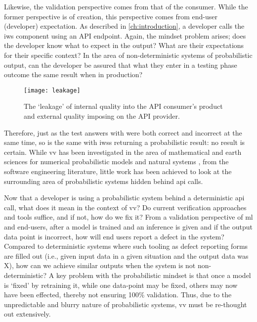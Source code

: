 Likewise, the validation perspective comes from that of the consumer. While the former perspective is of creation, this perspective comes from end-user (developer) expectation. As described in \cref{ch:introduction}, a developer calls the \gls{iws} component using an API endpoint. Again, the mindset problem arises; does the developer know what to expect in the output? What are their expectations for their specific context? In the area of non-deterministic systems of probabilistic output, can the developer be assured that what they enter in a testing phase outcome the same result when in production?

\begin{figure}[hbt]
  \centering
  \texttt{[image: leakage]}
  \caption[Leakage of internal and external quality in ]{The `leakage' of internal quality into the API consumer's product and external quality imposing on the API provider.}
  \label{fig:background:software-quality:v-and-v:leakage}
\end{figure}

Therefore, just as the test answers with were both correct and incorrect at the same time, so is the same with \glspl{iws} returning a probabilistic result: no result is certain. While \gls{vv} has been investigated in the area of mathematical and earth sciences for numerical probabilistic models and natural systems \citep{Oreskes:1994gn,Rutten:2004a}, from the software engineering literature, little work has been achieved to look at the surrounding area of probabilistic systems hidden behind \gls{api} calls. 

Now that a developer is using  a probabilistic system behind a deterministic \gls{api} call, what does it mean in the context of \gls{vv}? Do current verification approaches and tools suffice, and if not, how do we fix it? From a validation perspective of \gls{ml} and end-users, after a model is trained and an inference is given and if the output data point is incorrect, how will end users report a defect in the system? Compared to deterministic systems where such tooling as defect reporting forms are filled out (i.e., given input data in a given situation and the output data was X), how can we achieve similar outputs when the system is not non-deterministic? A key problem with the probabilistic mindset is that once a model is `fixed' by retraining it, while one data-point may be fixed, others may now have been effected, thereby not ensuring 100\% validation. Thus, due to the unpredictable and blurry nature of probabilistic systems, \gls{vv} must be re-thought out extensively.

